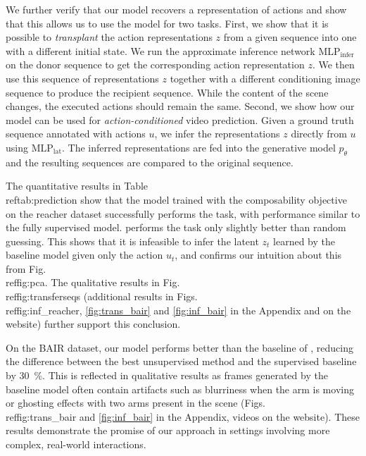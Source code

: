 \documentclass{article} %
\begin{document}
We further verify that our model recovers a representation of actions and show that this allows us to use the model for two tasks. First, we show that it is possible to \textit{transplant} the action representations $z$ from a given sequence into one with a different initial state. We run the approximate inference network $\text{MLP}_\text{infer}$ on the donor sequence to get the corresponding action representation $z$. We then use this sequence of representations $z$ together with a different conditioning image sequence to produce the recipient sequence.
While the content of the scene changes, the executed actions should remain the same. 
Second, we show how our model can be used for \textit{action-conditioned} video prediction. Given a ground truth sequence annotated with actions $u$, we infer the representations $z$ directly from $u$ using \(\text{MLP}_\text{lat}\). The inferred representations are fed into the generative model $p_\theta$ and the resulting sequences are compared to the original sequence.  

The quantitative results in Table\\ref{tab:prediction} show that the model trained with the composability objective on the reacher dataset successfully performs the task, with performance similar to the fully supervised model.  \cite{denton18stochastic} performs the task only slightly better than random guessing. This shows that it is infeasible to infer the latent $z_t$ learned by the baseline model given only the action $u_t$, and confirms our intuition about this from Fig.\\ref{fig:pca}. The qualitative results in Fig.\\ref{fig:transferseqs} (additional results in Figs.\\ref{fig:inf_reacher}, \ref{fig:trans_bair} and \ref{fig:inf_bair} in the Appendix and on the website) further support this conclusion.


On the BAIR dataset, our model performs better than the baseline of \cite{denton18stochastic},
 reducing the difference between the best unsupervised method and the supervised baseline by \SI{30}{\percent}. This is reflected in qualitative results as  frames generated by the baseline model often contain artifacts such as blurriness when the arm is moving or ghosting effects with two arms present in the scene (Figs.\\ref{fig:trans_bair} and \ref{fig:inf_bair} in the Appendix, videos on the website). These results demonstrate the promise of our approach in settings involving more complex, real-world interactions.
\end{document}
